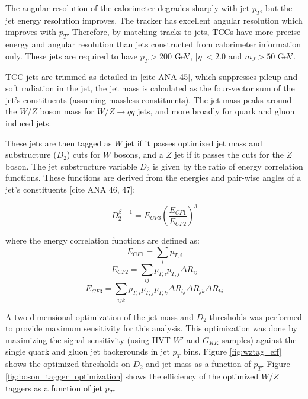 The angular resolution of the calorimeter degrades sharply with jet $p_{T}$, but the jet energy resolution improves. The tracker has excellent angular resolution which improves with $p_{T}$. Therefore, by matching tracks to jets, TCCs have more precise energy and angular resolution than jets constructed from calorimeter information only. These jets are required to have $p_{T}>200$ GeV, $|\eta| < 2.0$ and $m_{J} > 50$ GeV. 

TCC jets are trimmed as detailed in [cite ANA 45], which suppresses pileup and soft radiation in the jet, the jet mass is calculated as the four-vector sum of the jet's constituents (assuming massless constituents). The jet mass peaks around the $W/Z$ boson mass for $W/Z \rightarrow qq$ jets, and more broadly for quark and gluon induced jets. 

These jets are then tagged as $W$ jet if it passes optimized jet mass and substructure ($D_{2}$) cuts for $W$ bosons, and a $Z$ jet if it passes the cuts for the $Z$ boson. The jet substructure variable $D_{2}$ is given by the ratio of energy correlation functions. These functions are derived from the energies and pair-wise angles of a jet's constituents [cite ANA 46, 47]:

\begin{equation}
D_{2}^{\beta=1} = E_{CF3}\left(\frac{E_{CF1}}{E_{CF2}}\right)^{3}
\end{equation}

where the energy correlation functions are defined as:
\begin{equation}
E_{CF1}=\sum_{i}p_{T,i}
\end{equation}
\begin{equation}
E_{CF2}=\sum_{ij}p_{T,i}p_{T,j}\Delta R_{ij}
\end{equation}
\begin{equation}
E_{CF3}=\sum_{ijk}p_{T,i}p_{T,j}p_{T,k}\Delta R_{ij}\Delta R_{jk}\Delta R_{ki}
\end{equation}

A two-dimensional optimization of the jet mass and $D_{2}$ thresholds was performed to provide maximum sensitivity for this analysis. This optimization was done by maximizing the signal sensitivity (using  HVT $W'$ and $G_{KK}$ samples) against the single quark and gluon jet backgrounds in jet $p_{T}$ bins.  Figure \ref{fig:wztag_eff} shows the optimized thresholds on $D_{2}$ and jet mass as a function of $p_{T}$. Figure \ref{fig:boson_tagger_optimization} shows the efficiency of the optimized $W/Z$ taggers as a function of jet $p_{T}$. 


